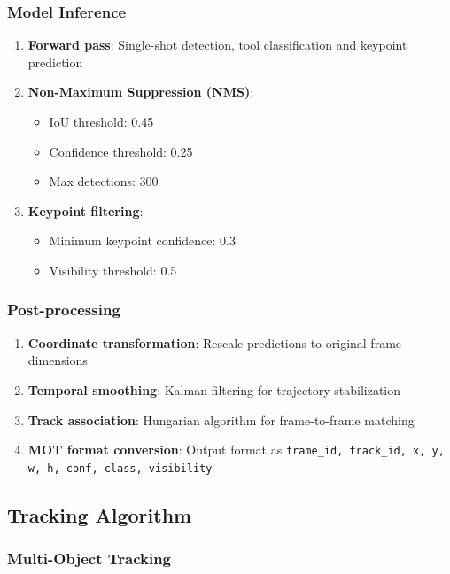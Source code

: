 \documentclass[11pt]{article}
\begin{document}
\subsubsection{Model Inference}

\begin{enumerate}[noitemsep]
    \item \textbf{Forward pass}: Single-shot detection, tool classification and keypoint prediction
    \item \textbf{Non-Maximum Suppression (NMS)}:
    \begin{itemize}[noitemsep]
        \item IoU threshold: 0.45
        \item Confidence threshold: 0.25
        \item Max detections: 300
    \end{itemize}
    \item \textbf{Keypoint filtering}:
    \begin{itemize}[noitemsep]
        \item Minimum keypoint confidence: 0.3
        \item Visibility threshold: 0.5
    \end{itemize}
\end{enumerate}

\subsubsection{Post-processing}

\begin{enumerate}[noitemsep]
    \item \textbf{Coordinate transformation}: Rescale predictions to original frame dimensions
    \item \textbf{Temporal smoothing}: Kalman filtering for trajectory stabilization
    \item \textbf{Track association}: Hungarian algorithm for frame-to-frame matching
    \item \textbf{MOT format conversion}: Output format as \texttt{frame\_id, track\_id, x, y, w, h, conf, class, visibility}
\end{enumerate}

\subsection{Tracking Algorithm}

\subsubsection{Multi-Object Tracking}
\end{document}
